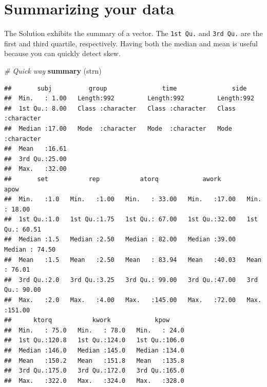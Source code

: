 \documentclass[
]{book}
\newenvironment{Shaded}{\begin{snugshade}}{\end{snugshade}}
\newcommand{\CommentTok}[1]{\textcolor[rgb]{0.56,0.35,0.01}{\textit{#1}}}
\newcommand{\KeywordTok}[1]{\textcolor[rgb]{0.13,0.29,0.53}{\textbf{#1}}}
\newcommand{\NormalTok}[1]{#1}
\begin{document}
\hypertarget{summarizing-your-data}{%
\section{Summarizing your data}\label{summarizing-your-data}}

The Solution exhibits the summary of a vector. The \texttt{1st\ Qu.} and \texttt{3rd\ Qu.} are the first and third quartile, respectively. Having both the median and mean is useful because you can
quickly detect skew.

\begin{Shaded}
\begin{Highlighting}[]
\CommentTok{# Quick way}
\KeywordTok{summary}\NormalTok{ (strn)}
\end{Highlighting}
\end{Shaded}

\begin{verbatim}
##       subj          group               time               side          
##  Min.   : 1.00   Length:992         Length:992         Length:992        
##  1st Qu.: 8.00   Class :character   Class :character   Class :character  
##  Median :17.00   Mode  :character   Mode  :character   Mode  :character  
##  Mean   :16.61                                                           
##  3rd Qu.:25.00                                                           
##  Max.   :32.00                                                           
##       set           rep           atorq            awork            apow       
##  Min.   :1.0   Min.   :1.00   Min.   : 33.00   Min.   :17.00   Min.   : 18.00  
##  1st Qu.:1.0   1st Qu.:1.75   1st Qu.: 67.00   1st Qu.:32.00   1st Qu.: 60.51  
##  Median :1.5   Median :2.50   Median : 82.00   Median :39.00   Median : 74.50  
##  Mean   :1.5   Mean   :2.50   Mean   : 83.94   Mean   :40.03   Mean   : 76.01  
##  3rd Qu.:2.0   3rd Qu.:3.25   3rd Qu.: 99.00   3rd Qu.:47.00   3rd Qu.: 90.00  
##  Max.   :2.0   Max.   :4.00   Max.   :145.00   Max.   :72.00   Max.   :151.00  
##      ktorq           kwork            kpow      
##  Min.   : 75.0   Min.   : 78.0   Min.   : 24.0  
##  1st Qu.:120.8   1st Qu.:124.0   1st Qu.:106.0  
##  Median :146.0   Median :145.0   Median :134.0  
##  Mean   :150.2   Mean   :151.8   Mean   :135.8  
##  3rd Qu.:175.0   3rd Qu.:172.0   3rd Qu.:165.0  
##  Max.   :322.0   Max.   :324.0   Max.   :328.0
\end{verbatim}
\end{document}
